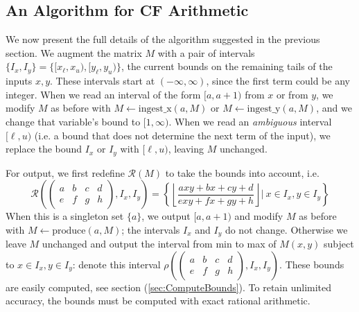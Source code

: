 \documentclass[11pt, oneside]{amsart}   	%
\newcommand{\bihom}[8]{{\frac{#1 xy + #2 x + #3 y + #4}{#5 xy + #6 x + #7 y + #8}}}
\newcommand{\abcd}{\left(
\begin{smallmatrix} 
a & b & c & d\\ 
e & f & g & h
\end{smallmatrix}
\right)}
\begin{document}
\subsection{An Algorithm for CF Arithmetic}\label{sec:finalAlgorithm}
We now present the full details of the algorithm suggested in the previous section.  We augment the matrix $M$ with a pair of intervals
$\{I_x, I_y\} = \{[x_{\ell},x_{u}), [y_{\ell}, y_{u})\}$, the current bounds on the remaining tails of the inputs $x,y$. These
intervals start at $(-\infty, \infty)$, since the first term could be any integer. When we read an interval of the form $[a,a+1)$ from
$x$ or from $y$, we modify $M$ as before with $M \leftarrow \mbox{ingest\_x}(a,M)$ or $M \leftarrow \mbox{ingest\_y}(a,M)$,
and we change that variable's bound to $[1, \infty)$. When we read an \emph{ambiguous} interval $[\ell, u)$ (i.e. a bound that
does not determine the next term of the input), we replace the bound $I_x$ or $I_y$  with $[\ell, u)$, leaving $M$ unchanged.

For output, we first redefine $\mathcal{R}(M)$ to take the bounds into account, i.e.
\begin{equation}
\mathcal{R}\left(\abcd, I_x, I_y\right) = \left\{ \left\lfloor \bihom{a}{b}{c}{d}{e}{f}{g}{h} \right\rfloor | \  x \in I_x, y \in I_y \right\}
\end{equation}
When this is a singleton set $\{a\}$, we output $[a,a+1)$ and modify $M$ as before with $M \leftarrow \mbox{produce}(a,M)$;
the intervals $I_x$ and $I_y$ do not change. Otherwise we leave $M$ unchanged and output the interval from min to max of $M(x,y)$ subject to $x \in I_x, y \in I_y$:
denote this interval $\rho\left(\abcd, I_x, I_y\right)$.
These bounds are easily computed, see section (\ref{sec:ComputeBounds}).
To retain unlimited accuracy, the bounds must be computed with exact rational arithmetic.
\end{document}
